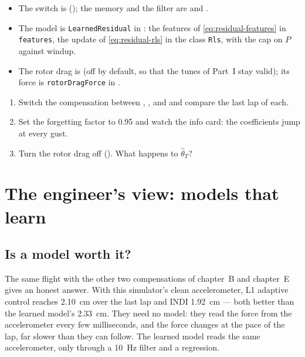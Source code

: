 \begin{inapp}
\begin{itemize}[leftmargin=1.2em]
  \item The switch is  (); the memory and the filter are  and .
  \item The model is \texttt{LearnedResidual} in : the features of \cref{eq:residual-features} in \texttt{features}, the update of \cref{eq:residual-rls} in the class \texttt{Rls}, with the cap on $P$ against windup.
  \item The rotor drag is  (off by default, so that the tunes of Part~I stay valid); its force is \texttt{rotorDragForce} in .
\end{itemize}
\end{inapp}

\begin{trythis}
\begin{enumerate}
  \item Switch the compensation between , ,  and  and compare the last lap of each.
  \item Set the forgetting factor to 0.95 and watch the info card: the coefficients jump at every gust.
  \item Turn the rotor drag off (). What happens to $\hat\theta_T$?
\end{enumerate}
\end{trythis}

\section{The engineer's view: models that learn}

\subsection{Is a model worth it?}
The same flight with the other two compensations of chapter~B and chapter~E gives an honest answer. With this simulator's clean accelerometer, L1 adaptive control reaches \SI{2.10}{cm} over the last lap and INDI \SI{1.92}{cm} — both better than the learned model's \SI{2.33}{cm}. They need no model: they read the force from the accelerometer every few milliseconds, and the force changes at the pace of the lap, far slower than they can follow. The learned model reads the same accelerometer, only through a \SI{10}{Hz} filter and a regression.

